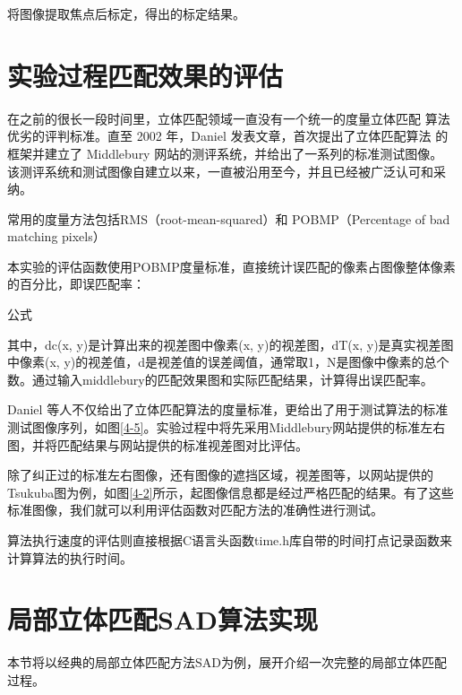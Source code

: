 
将图像提取焦点后标定，得出的标定结果。

\section{实验过程匹配效果的评估}

在之前的很长一段时间里，立体匹配领域一直没有一个统一的度量立体匹配
算法优劣的评判标准。直至 2002 年，Daniel 发表文章，首次提出了立体匹配算法
的框架并建立了 Middlebury 网站的测评系统，并给出了一系列的标准测试图像。
该测评系统和测试图像自建立以来，一直被沿用至今，并且已经被广泛认可和采
纳。

常用的度量方法包括RMS（root-mean-squared）和 POBMP（Percentage of bad matching pixels）

本实验的评估函数使用POBMP度量标准，直接统计误匹配的像素占图像整体像素的百分比，即误匹配率：

{{{公式}}}

其中，dc(x, y)是计算出来的视差图中像素(x, y)的视差图，dT(x, y)是真实视差图中像素(x, y)的视差值，d是视差值的误差阈值，通常取1，N是图像中像素的总个数。通过输入middlebury的匹配效果图和实际匹配结果，计算得出误匹配率。

Daniel 等人不仅给出了立体匹配算法的度量标准，更给出了用于测试算法的标准测试图像序列，如图\ref{4-5}。实验过程中将先采用Middlebury网站提供的标准左右图，并将匹配结果与网站提供的标准视差图对比评估。


除了纠正过的标准左右图像，还有图像的遮挡区域，视差图等，以网站提供的Tsukuba图为例，如图\ref{4-2}所示，起图像信息都是经过严格匹配的结果。有了这些标准图像，我们就可以利用评估函数对匹配方法的准确性进行测试。


算法执行速度的评估则直接根据C语言头函数time.h库自带的时间打点记录函数来计算算法的执行时间。

\section{局部立体匹配SAD算法实现}

本节将以经典的局部立体匹配方法SAD为例，展开介绍一次完整的局部立体匹配过程。

